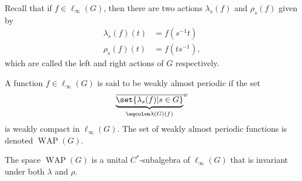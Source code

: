 \documentclass[10pt]{mypackage}
\begin{document}
Recall that if $f\in \ell_{\infty}\left( G \right)$, then there are two actions $\lambda_s(f)$ and $\rho_s(f)$ given by
\begin{align*}
  \lambda_s(f)(t) &= f\left( s^{-1}t \right)\\
  \rho_s(f)(t) &= f\left( ts^{-1} \right),
\end{align*}
which are called the left and right actions of $G$ respectively.
\begin{definition}
  A function $f\in \ell_{\infty}\left( G \right)$ is said to be weakly almost periodic if the set
  \begin{align*}
    \overline{\underbrace{\set{\lambda_s(f) | s\in G}}_{\eqcolon\lambda(G)(f)}}^{w}
  \end{align*}
  is weakly compact in $\ell_{\infty}\left( G \right)$. The set of weakly almost periodic functions is denoted $\operatorname{WAP}\left( G \right)$.
\end{definition}
\begin{proposition}
  The space $\operatorname{WAP}\left( G \right)$ is a unital $C^{\ast}$-subalgebra of $\ell_{\infty}\left( G \right)$ that is invariant under both $\lambda$ and $\rho$.
\end{proposition}
\end{document}
